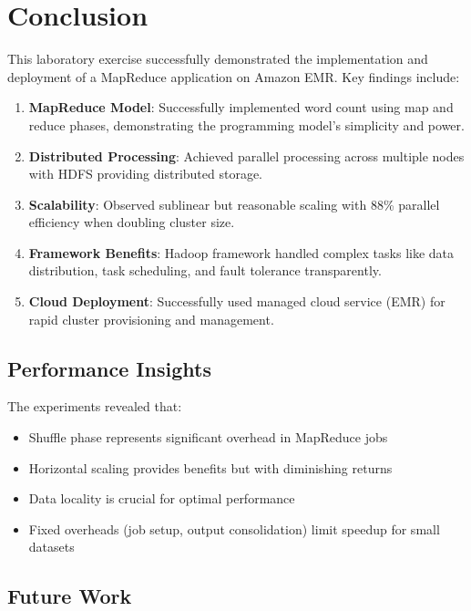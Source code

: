 \documentclass[11pt,a4paper]{article}
\begin{document}
\section{Conclusion}

This laboratory exercise successfully demonstrated the implementation and deployment of a MapReduce application on Amazon EMR. Key findings include:

\begin{enumerate}
    \item \textbf{MapReduce Model}: Successfully implemented word count using map and reduce phases, demonstrating the programming model's simplicity and power.
    
    \item \textbf{Distributed Processing}: Achieved parallel processing across multiple nodes with HDFS providing distributed storage.
    
    \item \textbf{Scalability}: Observed sublinear but reasonable scaling with 88\% parallel efficiency when doubling cluster size.
    
    \item \textbf{Framework Benefits}: Hadoop framework handled complex tasks like data distribution, task scheduling, and fault tolerance transparently.
    
    \item \textbf{Cloud Deployment}: Successfully used managed cloud service (EMR) for rapid cluster provisioning and management.
\end{enumerate}

\subsection{Performance Insights}

The experiments revealed that:

\begin{itemize}
    \item Shuffle phase represents significant overhead in MapReduce jobs
    \item Horizontal scaling provides benefits but with diminishing returns
    \item Data locality is crucial for optimal performance
    \item Fixed overheads (job setup, output consolidation) limit speedup for small datasets
\end{itemize}

\subsection{Future Work}
\end{document}
